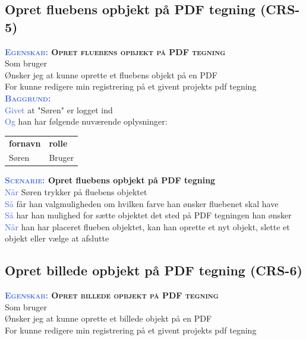 \subsection{Opret fluebens opbjekt på PDF tegning (CRS-5)} \label{sec:USOpretFlueben}
\textbf{\textsc{\textcolor{RoyalBlue}{Egenskab:} Opret fluebens opbjekt på PDF tegning}}\\
Som bruger\\
Ønsker jeg at kunne oprette et fluebens objekt på en PDF\\
For kunne redigere min registrering på et givent projekts pdf tegning \\

\textsc{\textcolor{RoyalBlue}{\textbf{Baggrund:}}}\\
\textcolor{RoyalBlue}{Givet} at "Søren" er logget ind\\
\textcolor{RoyalBlue}{Og} han har følgende nuværende oplysninger:\\
\begin{tabular}{| l | l |}
	\textbf{fornavn} & \textbf{rolle} \\
	Søren & Bruger\\
\end{tabular}

\textbf{\textsc{\textcolor{RoyalBlue}{Scenarie:}} Opret fluebens opbjekt på PDF tegning}\\
\textcolor{RoyalBlue}{Når} Søren trykker på fluebens objektet\\
\textcolor{RoyalBlue}{Så}  får han valgmuligheden om hvilken farve han ønsker fluebenet skal have\\
\textcolor{RoyalBlue}{Så}  har han mulighed for sætte objektet det sted på PDF tegningen han ønsker\\
\textcolor{RoyalBlue}{Når} han har placeret flueben objektet, kan han oprette et nyt objekt, slette et objekt eller vælge at afslutte \\

\subsection{Opret billede opbjekt på PDF tegning (CRS-6)} \label{sec:USOpretBillede}
\textbf{\textsc{\textcolor{RoyalBlue}{Egenskab:} Opret billede opbjekt på PDF tegning}}\\
Som bruger\\
Ønsker jeg at kunne oprette et billede objekt på en PDF\\
For kunne redigere min registrering på et givent projekts pdf tegning \\

